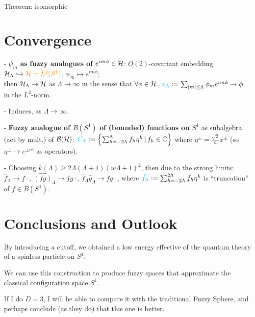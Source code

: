 Theorem: isomorphic



\section{Convergence}

{
    \color{gray}
    
    - \textbf{$\psi_m$ as fuzzy analogues of $e^{i m \phi} \in \hcal$}: $O(2)$-covariant embedding $\mathcal H_\Lambda \hookrightarrow \textcolor{orange}{\mathcal H = L^2(S^1)}$, $\psi_m \mapsto e^{im\phi}$; \hfill \\then $\mathcal H_\Lambda \to \mathcal H$ as $\Lambda \to \infty$ in the sense that $\forall \phi \in \hcal$, $\lbtext{\phi_\Lambda} := \sum_{|m| \leq \Lambda} \phi_m e^{im\phi} \to \phi$ in the $L^2$-norm.
    
    - Induces,  as $\Lambda \to \infty$.
    
    - \textbf{Fuzzy analogue of $B(S^1)$ of (bounded) functions on $S^1$} as subalgebra (act by mult.) of $\mathcal B(\mathcal H)$: $\textcolor{cyan}{C_\Lambda} := \left\{ \sum_{h = -2\Lambda}^\Lambda f_h \eta^h \,|\, f_h \in \mathbb{C}\right\}$ where $\eta^\pm  = \frac{\sqrt{2}}{a}x^\pm$ (so $\eta^\pm \to e^{\pm i \phi}$ as operators).
    
    - Choosing $k(\Lambda) \geq 2 \Lambda(\Lambda + 1)(w\Lambda+1)^2$, then  due to the strong limits: $\hat f_\Lambda \to f\cdot$, $\hat{(fg)}_\Lambda \to fg\cdot $, $\hat f_\Lambda \hat g_\Lambda \to fg\cdot$, where $\textcolor{cyan}{\hat f_\Lambda} := \sum_{h = -2\Lambda}^{2\Lambda} f_h \eta^h$ is ``truncation'' of $f \in B(S^1)$.
    
}

\linea

\section{Conclusions and Outlook}

{\color{gray}

    By introducing a cutoff, we obtained a low energy effective of the quantum theory of a spinless particle on $S^d$.
    
    We can use this construction to produce fuzzy spaces that approximate the classical configuration space $S^1$.
    
    If I do $D = 3$, I will be able to compare it with the traditional Fuzzy Sphere, and perhaps conclude (as they do) that this one is better.
}